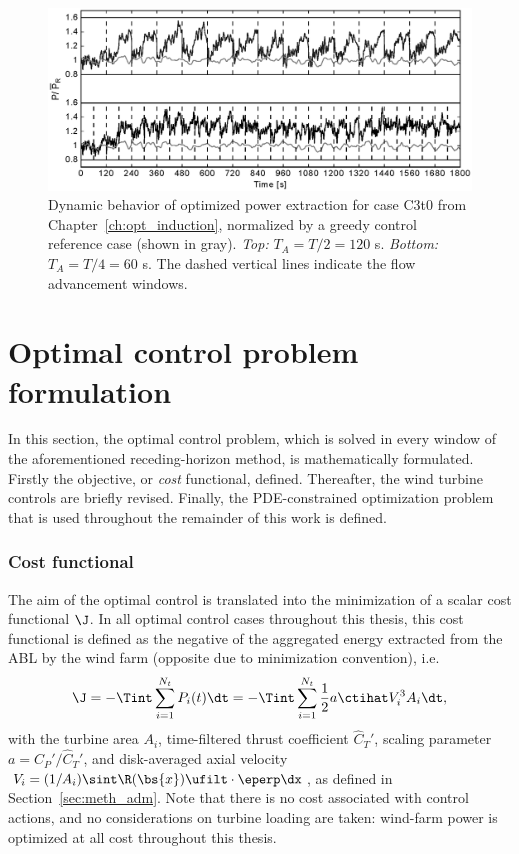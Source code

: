 \begin{figure}
	\centering
	\includegraphics[width=\linewidth]{chapters/optimal_control_problem/figure10.eps}
	\caption{Dynamic behavior of optimized power extraction for case C3t0 from Chapter~\ref{ch:opt_induction}, normalized by a greedy control reference case (shown in gray). \emph{Top: } $T_A = T/2 = 120$ s. \emph{Bottom: } $T_A = T/4 = 60$ s. The dashed vertical lines indicate the flow advancement windows.\label{fig:T_A}}
\end{figure}


\section{Optimal control problem formulation}\label{sec:problem_formulation}

In this section, the optimal control problem, which is solved in every window of the aforementioned receding-horizon method, is mathematically formulated. Firstly the objective, or \emph{cost} functional, defined. Thereafter, the wind turbine controls are briefly revised. Finally, the PDE-constrained optimization problem that is used throughout the remainder of this work is defined. 

\subsubsection{Cost functional}
The aim of the optimal control is translated into the minimization of a scalar cost functional $\J$. In all optimal control cases throughout this thesis, this cost functional is defined as the negative of the aggregated energy extracted from the ABL by the wind farm (opposite due to minimization convention), i.e.
\begin{equation}\label{eq:costfunction}
	\J = - \Tint \sum_{i=1}^{N_t} P_i(t) \dt = - \Tint \sum_{i=1}^{N_t} \frac{1}{2} a \ctihat V_i^3 A_i \dt,
\end{equation}
with the turbine area $A_i$, time-filtered thrust coefficient $\widehat{C}_T'$, scaling parameter $a = C_P'/\widehat{C}_T'$, and disk-averaged axial velocity $V_i = (1/A_i) \sint  \R(\bs{x}) \ufilt \cdot \eperp \dx$, as defined in Section~\ref{sec:meth_adm}. Note that there is no cost associated with control actions, and no considerations on turbine loading are taken: wind-farm power is optimized at all cost throughout this thesis. 

